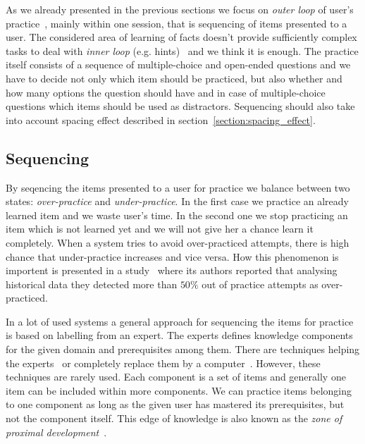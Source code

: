 \documentclass[table,color]{fithesis3/fithesis3}
\begin{document}
As we already presented in the previous sections we focus on \emph{outer loop}
of user's practice~\cite{vanlehn2006behavior}, mainly within one session, that
is sequencing of items presented to a user. The considered area of learning
of facts doesn't provide sufficiently complex tasks to deal with \emph{inner
loop} (e.g. hints)~\cite{vanlehn2006behavior} and we think it is enough. The
practice itself consists of a sequence of multiple-choice and open-ended
questions and we have to decide not only which item should be practiced, but
also whether and how many options the question should have and in case of
multiple-choice questions which items should be used as distractors. Sequencing
should also take into account spacing effect described in
section~\ref{section:spacing_effect}.

\subsection{Sequencing}

By seqencing the items presented to a user for practice we balance between two
states: \emph{over-practice} and \emph{under-practice}. In the first case we
practice an already learned item and we waste user's time. In the second one we
stop practicing an item which is not learned yet and we will not give her a
chance learn it completely. When a system tries to avoid over-practiced
attempts, there is high chance that under-practice increases and vice versa.
How this phenomenon is importent is presented in a study~\cite{cen2007over}
where its authors reported that analysing historical data they detected more
than $50\%$ out of practice attempts as over-practiced.

In a lot of used systems a general approach for sequencing the items for
practice is based on labelling from an expert. The experts defines knowledge
components for the given domain and prerequisites among them. There are
techniques helping the ex\-perts~\cite{niznan2014using} or completely replace
them by a computer~\cite{boros2013automatic}. However, these techniques are
rarely used. Each component is a set of items and generally one item can be
included within more components. We can practice items belonging to one
component as long as the given user has mastered its prerequisites, but not the
component itself. This edge of knowledge is also known as the \emph{zone of
proximal development}~\cite{lee2005signifying}.
\end{document}
